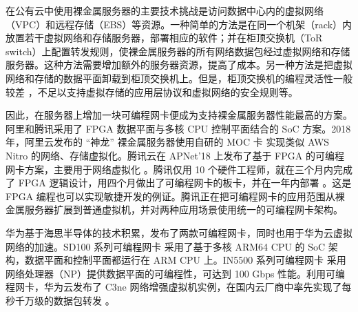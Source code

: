 在公有云中使用裸金属服务器的主要技术挑战是访问数据中心内的虚拟网络（VPC）和远程存储（EBS）等资源。一种简单的方法是在同一个机架（rack）内放置若干虚拟网络和存储服务器，部署相应的软件；并在柜顶交换机（ToR switch）上配置转发规则，使裸金属服务器的所有网络数据包经过虚拟网络和存储服务器。这种方法需要增加额外的服务器资源，提高了成本。另一种方法是把虚拟网络和存储的数据平面卸载到柜顶交换机上。但是，柜顶交换机的编程灵活性一般较差 \cite{tencent-smartnic}，不足以支持虚拟存储的应用层协议和虚拟网络的安全规则等。

因此，在服务器上增加一块可编程网卡便成为支持裸金属服务器性能最高的方案。阿里和腾讯采用了 FPGA 数据平面与多核 CPU 控制平面结合的 SoC 方案。2018 年，阿里云发布的 ``神龙'' 裸金属服务器使用自研的 MOC 卡 \cite{alicloud-smartnic,alicloud-xdragon} 实现类似 AWS Nitro 的网络、存储虚拟化。腾讯云在 APNet’18 上发布了基于 FPGA 的可编程网卡方案，主要用于网络虚拟化 \cite{tencent-smartnic}。腾讯仅用 10 个硬件工程师，就在三个月内完成了 FPGA 逻辑设计，用四个月做出了可编程网卡的板卡，并在一年内部署 \cite{tencent-smartnic}。这是 FPGA 编程也可以实现敏捷开发的例证。腾讯正在把可编程网卡的应用范围从裸金属服务器扩展到普通虚拟机，并对两种应用场景使用统一的可编程网卡架构。

华为基于海思半导体的技术积累，发布了两款可编程网卡，同时也用于华为云虚拟网络的加速。SD100 系列可编程网卡 \cite{sd100} 采用了基于多核 ARM64 CPU 的 SoC 架构，数据平面和控制平面都运行在 ARM CPU 上。IN5500 系列可编程网卡 \cite{in200} 采用网络处理器（NP）提供数据平面的可编程性，可达到 100 Gbps 性能。利用可编程网卡，华为云发布了 C3ne 网络增强虚拟机实例，在国内云厂商中率先实现了每秒千万级的数据包转发 \cite{huawei-smartnic}。
